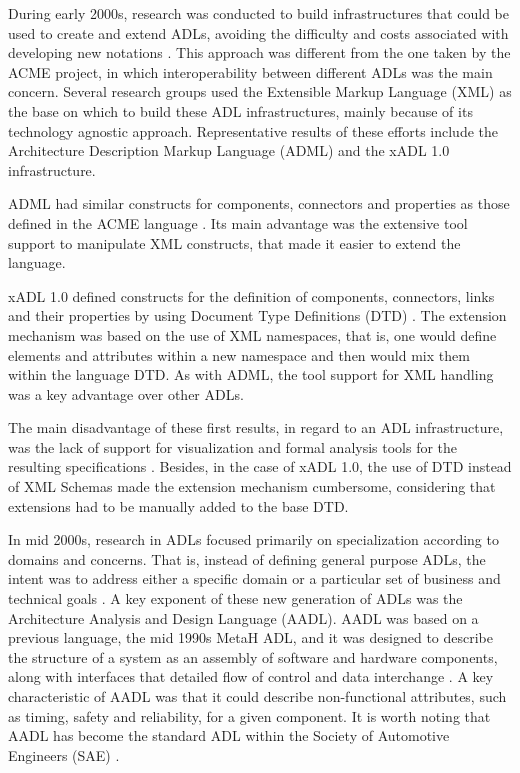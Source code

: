 \documentclass[10pt]{article}
\begin{document}
During early 2000s, research was conducted to build infrastructures that could be used to create and extend ADLs, avoiding the difficulty and costs associated with developing new notations \cite{Dashofy02}. This approach was different from the one taken by the ACME project, in which interoperability between different ADLs was the main concern. Several research groups used the Extensible Markup Language (XML) as the base on which to build these ADL infrastructures, mainly because of its technology agnostic approach. Representative results of these efforts include the Architecture Description Markup Language (ADML) and the xADL 1.0 infrastructure.

ADML had similar constructs for components, connectors and properties as those defined in the ACME language \cite{Dashofy07}. Its main advantage was the extensive tool support to manipulate XML constructs, that made it easier to extend the language.

xADL 1.0 defined constructs for the definition of components, connectors, links and their properties by using Document Type Definitions (DTD) \cite{Dashofy07}. The extension mechanism was based on the use of XML namespaces, that is, one would define elements and attributes within a new namespace and then would mix them within the language DTD. As with ADML, the tool support for XML handling was a key advantage over other ADLs.

The main disadvantage of these first results, in regard to an ADL infrastructure, was the lack of support for visualization and formal analysis tools for the resulting specifications \cite{Medvidovic07}. Besides, in the case of xADL 1.0, the use of DTD instead of XML Schemas \cite{Sperberg00} made the extension mechanism cumbersome, considering that extensions had to be manually added to the base DTD.

In mid 2000s, research in ADLs focused primarily on specialization according to domains and concerns. That is, instead of defining general purpose ADLs, the intent was to address either a specific domain or a particular set of business and technical goals \cite{Medvidovic07}. A key exponent of these new generation of ADLs was the Architecture Analysis and Design Language (AADL). AADL was based on a previous language, the mid 1990s MetaH ADL, and it was designed to describe the structure of a system as an assembly of software and hardware components, along with interfaces that detailed flow of control and data interchange \cite{Feiler05}. A key characteristic of AADL was that it could describe non-functional attributes, such as timing, safety and reliability, for a given component. It is worth noting that AADL has become the standard ADL within the Society of Automotive Engineers (SAE) \cite{Dashofy07}.
\end{document}
